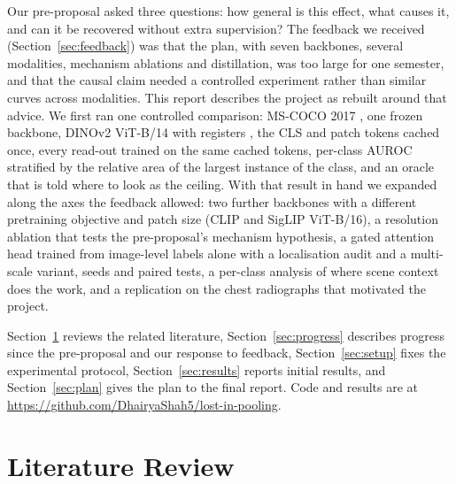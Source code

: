 \documentclass[10pt,letterpaper,twocolumn]{article}
\begin{document}
Our pre-proposal asked three questions: how general is this effect, what causes it, and can it
be recovered without extra supervision? The feedback we received (Section~\ref{sec:feedback})
was that the plan, with seven backbones, several modalities, mechanism ablations and
distillation, was too large for one semester, and that the causal claim needed a controlled
experiment rather than similar curves across modalities. This report describes the project
as rebuilt around that advice. We first ran one controlled comparison: MS-COCO 2017
\citep{lin2014coco}, one frozen backbone, DINOv2 ViT-B/14 with registers
\citep{oquab2024dinov2,darcet2024registers}, the CLS and patch tokens cached once, every
read-out trained on the same cached tokens, per-class AUROC stratified by the relative area of
the largest instance of the class, and an oracle that is told where to look as the ceiling.
With that result in hand we expanded along the axes the feedback allowed: two further
backbones with a different pretraining objective and patch size (CLIP and SigLIP ViT-B/16), a
resolution ablation that tests the pre-proposal's mechanism hypothesis, a gated attention
head trained from image-level labels alone with a localisation audit and a multi-scale
variant, seeds and paired tests, a per-class analysis of where scene context does the work,
and a replication on the chest radiographs that motivated the project.

Section~\ref{sec:lit} reviews the related literature, Section~\ref{sec:progress} describes
progress since the pre-proposal and our response to feedback, Section~\ref{sec:setup} fixes
the experimental protocol, Section~\ref{sec:results} reports initial results, and
Section~\ref{sec:plan} gives the plan to the final report. Code and results are at
\url{https://github.com/DhairyaShah5/lost-in-pooling}.

\section{Literature Review}
\label{sec:lit}
\end{document}
